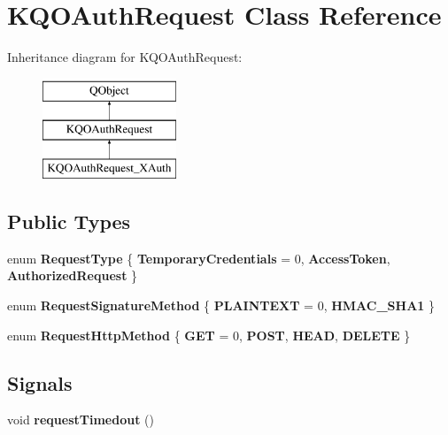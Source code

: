 \hypertarget{class_k_q_o_auth_request}{}\section{K\+Q\+O\+Auth\+Request Class Reference}
\label{class_k_q_o_auth_request}
Inheritance diagram for K\+Q\+O\+Auth\+Request\+:\begin{figure}[H]
\begin{center}
\leavevmode
\includegraphics[height=3.000000cm]{class_k_q_o_auth_request}
\end{center}
\end{figure}
\subsection*{Public Types}
\begin{DoxyCompactItemize}
\item 
\mbox{\label{class_k_q_o_auth_request_a272dea226ac6d936d40dad90f892c966}} 
enum {\bfseries Request\+Type} \{ {\bfseries Temporary\+Credentials} = 0, 
{\bfseries Access\+Token}, 
{\bfseries Authorized\+Request}
 \}
\item 
\mbox{\label{class_k_q_o_auth_request_aa6648d85065be1652d2e118438d2c5d9}} 
enum {\bfseries Request\+Signature\+Method} \{ {\bfseries P\+L\+A\+I\+N\+T\+E\+XT} = 0, 
{\bfseries H\+M\+A\+C\+\_\+\+S\+H\+A1}
 \}
\item 
\mbox{\label{class_k_q_o_auth_request_a9434eb4247149d6d9d86350c81f0f071}} 
enum {\bfseries Request\+Http\+Method} \{ {\bfseries G\+ET} = 0, 
{\bfseries P\+O\+ST}, 
{\bfseries H\+E\+AD}, 
{\bfseries D\+E\+L\+E\+TE}
 \}
\end{DoxyCompactItemize}
\subsection*{Signals}
\begin{DoxyCompactItemize}
\item 
\mbox{\label{class_k_q_o_auth_request_a97632d0435c94f74de2e89c6ebc05cfa}} 
void {\bfseries request\+Timedout} ()
\end{DoxyCompactItemize}
